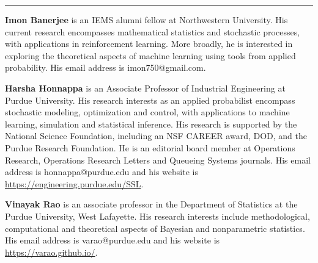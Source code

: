 \documentclass[opre,sglanonrev]{informs4}
\numberwithin{equation}{section}
\begin{document}
\vspace{0.1 cm}
\hrule
\vspace{0.5 cm}
\begin{footnotesize}
\textbf{Imon Banerjee} is an IEMS alumni fellow at Northwestern University. His current research encompasses mathematical statistics and stochastic processes, with applications in reinforcement learning. More broadly, he is interested in exploring the theoretical aspects of machine learning using tools from applied probability. His email address is imon750@gmail.com.

\textbf{Harsha Honnappa} is an Associate Professor of Industrial Engineering at Purdue University. His research interests as an applied probabilist encompass stochastic modeling, optimization and control, with applications to machine learning, simulation and statistical inference. His research is supported by the National Science Foundation, including an NSF CAREER award, DOD, and the Purdue Research Foundation. He is an editorial board member at Operations Research, Operations Research Letters and Queueing Systems journals.  His email address is {honnappa@purdue.edu} and his website is \url{https://engineering.purdue.edu/SSL}.

\textbf{Vinayak Rao}  is an associate professor in the Department of Statistics at the Purdue University, West Lafayette. His research interests include methodological, computational and theoretical aspects of Bayesian and nonparametric statistics. His email address is {varao@purdue.edu} and his website is \url{https://varao.github.io/}.    

\end{footnotesize}
\newpage
\end{document}
